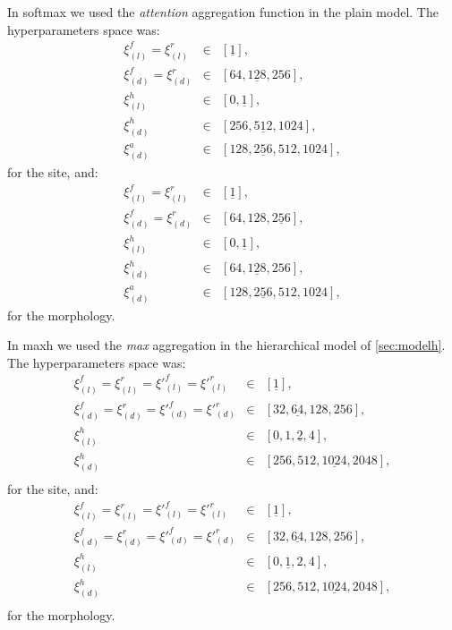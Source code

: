 In \ac{softmax} we used the \emph{attention} aggregation function in the
plain model. The hyperparameters
space was:
\begin{align*}
  \xi_{(l)}^f=\xi_{(l)}^r&\in&[\underline{1}],\\
  \xi_{(d)}^f=\xi_{(d)}^r&\in&[64,\underline{128},256],\\
  \xi_{(l)}^h&\in&[0,\underline{1}],\\
  \xi_{(d)}^h&\in&[256,\underline{512},1024],\\
  \xi_{(d)}^a&\in&[128,\underline{256},512,1024],
\end{align*}
for the site, and:
\begin{align*}
  \xi_{(l)}^f=\xi_{(l)}^r&\in&[\underline{1}],\\
  \xi_{(d)}^f=\xi_{(d)}^r&\in&[64,128,\underline{256}],\\
  \xi_{(l)}^h&\in&[0,\underline{1}],\\
  \xi_{(d)}^h&\in&[64,\underline{128},256],\\
  \xi_{(d)}^a&\in&[128,\underline{256},512,1024],
\end{align*}
for the morphology.

In \ac{maxh} we used the \emph{max} aggregation in the hierarchical
model of \cref{sec:modelh}. The hyperparameters space was:
\begin{align*}
  \xi_{(l)}^f=\xi_{(l)}^r=\xi'^f_{(l)}=\xi'^r_{(l)}&\in&[\underline{1}],\\
  \xi_{(d)}^f=\xi_{(d)}^r=\xi'^f_{(d)}=\xi'^r_{(d)}&\in&[32,\underline{64},128,256],\\
  \xi_{(l)}^h&\in&[0,1,\underline{2},4],\\
  \xi_{(d)}^h&\in&[256,512,\underline{1024},2048],\\
\end{align*}
for the site, and:
\begin{align*}
  \xi_{(l)}^f=\xi_{(l)}^r=\xi'^f_{(l)}=\xi'^r_{(l)}&\in&[\underline{1}],\\
  \xi_{(d)}^f=\xi_{(d)}^r=\xi'^f_{(d)}=\xi'^r_{(d)}&\in&[32,\underline{64},128,256],\\
  \xi_{(l)}^h&\in&[0,\underline{1},2,4],\\
  \xi_{(d)}^h&\in&[256,512,\underline{1024},2048],\\
\end{align*}
for the morphology.

